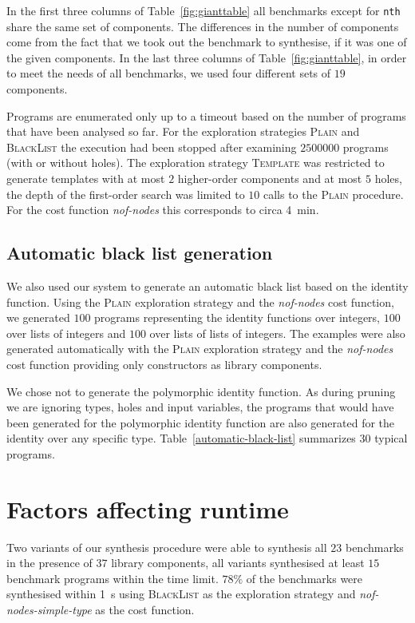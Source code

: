 In the first three columns of Table~\ref{fig:gianttable} all benchmarks except for \lstinline?nth? share the same set of components. The differences in the number of components come from the fact that we took out the benchmark to synthesise, if it was one of the given components.
In the last three columns of Table~\ref{fig:gianttable}, in order to meet the needs of all benchmarks, we used four different sets of $19$ components.

Programs are enumerated only up to a timeout based on the number of programs that have been analysed so far. For the exploration strategies \textsc{Plain} and \textsc{BlackList} the execution had been stopped after examining $2500000$ programs (with or without holes). The exploration strategy \textsc{Template} was restricted to generate templates with at most $2$ higher-order components and at most $5$ holes, the depth of the first-order search was limited to $10$ calls to the \textsc{Plain} procedure. For the cost function \textit{nof-nodes} this corresponds to circa \SI{4}{min}.


\subsection{Automatic black list generation}\label{Black list generation}
We also used our system to generate an automatic black list based on the identity function. Using the \textsc{Plain} exploration strategy and the \textit{nof-nodes} cost function, we generated $100$ programs representing the identity functions over integers, $100$ over lists of integers and $100$ over lists of lists of integers. The examples were also generated automatically with the \textsc{Plain} exploration strategy and the \textit{nof-nodes} cost function providing only constructors as library components.

We chose not to generate the polymorphic identity function. As during pruning we are ignoring types, holes and input variables, the programs that would have been generated for the polymorphic identity function are also generated for the identity over any specific type.
Table~\ref{automatic-black-list} summarizes $30$ typical programs.


\section{Factors affecting runtime}\label{Factors affecting runtime}
Two variants of our synthesis procedure were able to synthesis all $23$ benchmarks in the presence of $37$ library components, all variants synthesised at least $15$ benchmark programs within the time limit. $78\%$ of the benchmarks were synthesised within \SI{1}{s} using \textsc{BlackList} as the exploration strategy and \textit{nof-nodes-simple-type} as the cost function.

